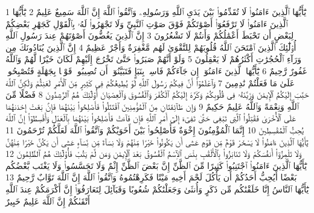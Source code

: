 {\tiny\colorbox{cl_aya}{1}} يَٰٓأَيُّهَا ٱلَّذِينَ ءَامَنُوا۟ لَا تُقَدِّمُوا۟ بَيْنَ يَدَىِ ٱللَّهِ وَرَسُولِهِۦ وَٱتَّقُوا۟ ٱللَّهَ إِنَّ ٱللَّهَ سَمِيعٌ عَلِيمٌ
{\tiny\colorbox{cl_aya}{2}} يَٰٓأَيُّهَا ٱلَّذِينَ ءَامَنُوا۟ لَا تَرْفَعُوٓا۟ أَصْوَٰتَكُمْ فَوْقَ صَوْتِ ٱلنَّبِىِّ وَلَا تَجْهَرُوا۟ لَهُۥ بِٱلْقَوْلِ كَجَهْرِ بَعْضِكُمْ لِبَعْضٍ أَن تَحْبَطَ أَعْمَٰلُكُمْ وَأَنتُمْ لَا تَشْعُرُونَ
{\tiny\colorbox{cl_aya}{3}} إِنَّ ٱلَّذِينَ يَغُضُّونَ أَصْوَٰتَهُمْ عِندَ رَسُولِ ٱللَّهِ أُو۟لَٰٓئِكَ ٱلَّذِينَ ٱمْتَحَنَ ٱللَّهُ قُلُوبَهُمْ لِلتَّقْوَىٰ لَهُم مَّغْفِرَةٌ وَأَجْرٌ عَظِيمٌ
{\tiny\colorbox{cl_aya}{4}} إِنَّ ٱلَّذِينَ يُنَادُونَكَ مِن وَرَآءِ ٱلْحُجُرَٰتِ أَكْثَرُهُمْ لَا يَعْقِلُونَ
{\tiny\colorbox{cl_aya}{5}} وَلَوْ أَنَّهُمْ صَبَرُوا۟ حَتَّىٰ تَخْرُجَ إِلَيْهِمْ لَكَانَ خَيْرًا لَّهُمْ وَٱللَّهُ غَفُورٌ رَّحِيمٌ
{\tiny\colorbox{cl_aya}{6}} يَٰٓأَيُّهَا ٱلَّذِينَ ءَامَنُوٓا۟ إِن جَآءَكُمْ فَاسِقٌۢ بِنَبَإٍ فَتَبَيَّنُوٓا۟ أَن تُصِيبُوا۟ قَوْمًۢا بِجَهَٰلَةٍ فَتُصْبِحُوا۟ عَلَىٰ مَا فَعَلْتُمْ نَٰدِمِينَ
{\tiny\colorbox{cl_aya}{7}} وَٱعْلَمُوٓا۟ أَنَّ فِيكُمْ رَسُولَ ٱللَّهِ لَوْ يُطِيعُكُمْ فِى كَثِيرٍ مِّنَ ٱلْأَمْرِ لَعَنِتُّمْ وَلَٰكِنَّ ٱللَّهَ حَبَّبَ إِلَيْكُمُ ٱلْإِيمَٰنَ وَزَيَّنَهُۥ فِى قُلُوبِكُمْ وَكَرَّهَ إِلَيْكُمُ ٱلْكُفْرَ وَٱلْفُسُوقَ وَٱلْعِصْيَانَ أُو۟لَٰٓئِكَ هُمُ ٱلرَّٰشِدُونَ
{\tiny\colorbox{cl_aya}{8}} فَضْلًا مِّنَ ٱللَّهِ وَنِعْمَةً وَٱللَّهُ عَلِيمٌ حَكِيمٌ
{\tiny\colorbox{cl_aya}{9}} وَإِن طَآئِفَتَانِ مِنَ ٱلْمُؤْمِنِينَ ٱقْتَتَلُوا۟ فَأَصْلِحُوا۟ بَيْنَهُمَا فَإِنۢ بَغَتْ إِحْدَىٰهُمَا عَلَى ٱلْأُخْرَىٰ فَقَٰتِلُوا۟ ٱلَّتِى تَبْغِى حَتَّىٰ تَفِىٓءَ إِلَىٰٓ أَمْرِ ٱللَّهِ فَإِن فَآءَتْ فَأَصْلِحُوا۟ بَيْنَهُمَا بِٱلْعَدْلِ وَأَقْسِطُوٓا۟ إِنَّ ٱللَّهَ يُحِبُّ ٱلْمُقْسِطِينَ
{\tiny\colorbox{cl_aya}{10}} إِنَّمَا ٱلْمُؤْمِنُونَ إِخْوَةٌ فَأَصْلِحُوا۟ بَيْنَ أَخَوَيْكُمْ وَٱتَّقُوا۟ ٱللَّهَ لَعَلَّكُمْ تُرْحَمُونَ
{\tiny\colorbox{cl_aya}{11}} يَٰٓأَيُّهَا ٱلَّذِينَ ءَامَنُوا۟ لَا يَسْخَرْ قَوْمٌ مِّن قَوْمٍ عَسَىٰٓ أَن يَكُونُوا۟ خَيْرًا مِّنْهُمْ وَلَا نِسَآءٌ مِّن نِّسَآءٍ عَسَىٰٓ أَن يَكُنَّ خَيْرًا مِّنْهُنَّ وَلَا تَلْمِزُوٓا۟ أَنفُسَكُمْ وَلَا تَنَابَزُوا۟ بِٱلْأَلْقَٰبِ بِئْسَ ٱلِٱسْمُ ٱلْفُسُوقُ بَعْدَ ٱلْإِيمَٰنِ وَمَن لَّمْ يَتُبْ فَأُو۟لَٰٓئِكَ هُمُ ٱلظَّٰلِمُونَ
{\tiny\colorbox{cl_aya}{12}} يَٰٓأَيُّهَا ٱلَّذِينَ ءَامَنُوا۟ ٱجْتَنِبُوا۟ كَثِيرًا مِّنَ ٱلظَّنِّ إِنَّ بَعْضَ ٱلظَّنِّ إِثْمٌ وَلَا تَجَسَّسُوا۟ وَلَا يَغْتَب بَّعْضُكُم بَعْضًا أَيُحِبُّ أَحَدُكُمْ أَن يَأْكُلَ لَحْمَ أَخِيهِ مَيْتًا فَكَرِهْتُمُوهُ وَٱتَّقُوا۟ ٱللَّهَ إِنَّ ٱللَّهَ تَوَّابٌ رَّحِيمٌ
{\tiny\colorbox{cl_aya}{13}} يَٰٓأَيُّهَا ٱلنَّاسُ إِنَّا خَلَقْنَٰكُم مِّن ذَكَرٍ وَأُنثَىٰ وَجَعَلْنَٰكُمْ شُعُوبًا وَقَبَآئِلَ لِتَعَارَفُوٓا۟ إِنَّ أَكْرَمَكُمْ عِندَ ٱللَّهِ أَتْقَىٰكُمْ إِنَّ ٱللَّهَ عَلِيمٌ خَبِيرٌ
